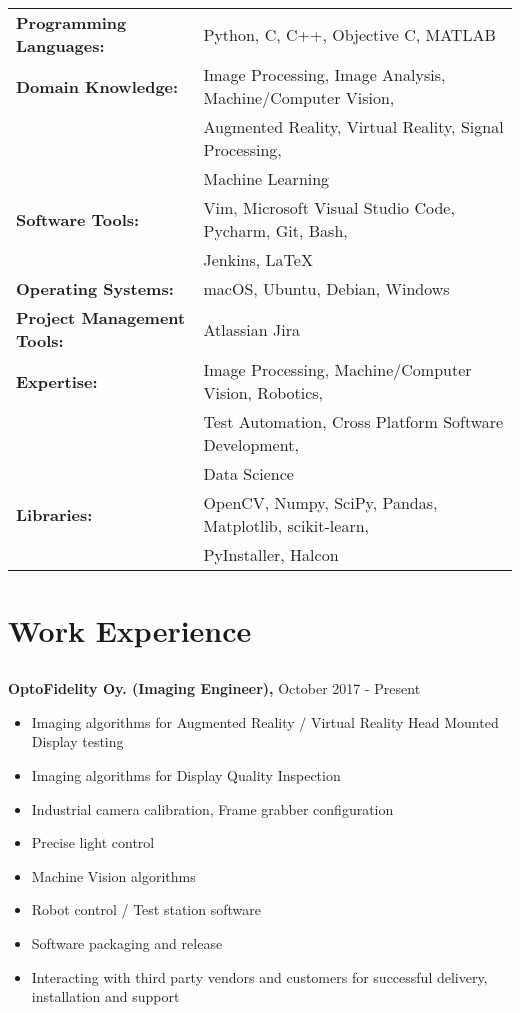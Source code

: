 \documentclass{article}
\begin{document}
\subsection{}
\begin{tabular}{l l}
  \textbf{Programming Languages:} & Python, C, C++, Objective C, MATLAB \\ [2pt]
  \textbf{Domain Knowledge:} & Image Processing, Image Analysis, Machine/Computer Vision, \\ 
                             & Augmented Reality, Virtual Reality, Signal Processing, \\
                             & Machine Learning \\ [2pt]
  \textbf{Software Tools:} & Vim, Microsoft Visual Studio Code, Pycharm, Git, Bash, \\
                           & Jenkins, LaTeX \\ [2pt]
  \textbf{Operating Systems:} & macOS, Ubuntu, Debian, Windows \\ [2pt]
  \textbf{Project Management Tools:} & Atlassian Jira \\ [2pt]
  \textbf{Expertise:} & Image Processing, Machine/Computer Vision, Robotics, \\
                      & Test Automation, Cross Platform Software Development, \\ 
                      & Data Science \\ [2pt]
  \textbf{Libraries:} & OpenCV, Numpy, SciPy, Pandas, Matplotlib, scikit-learn, \\
                      & PyInstaller, Halcon \\
\end{tabular}
\subsection{}

\section{Work Experience}
\subsection{}
\textbf{OptoFidelity Oy. (Imaging Engineer),} October 2017 - Present
\begin{itemize}[leftmargin=0.75in]
  \item Imaging algorithms for Augmented Reality / Virtual Reality Head Mounted Display testing
  \item Imaging algorithms for Display Quality Inspection
  \item Industrial camera calibration, Frame grabber configuration
  \item Precise light control
  \item Machine Vision algorithms
  \item Robot control / Test station software
  \item Software packaging and release
  \item Interacting with third party vendors and customers for successful
    delivery, installation and support
\end{itemize}
\end{document}
